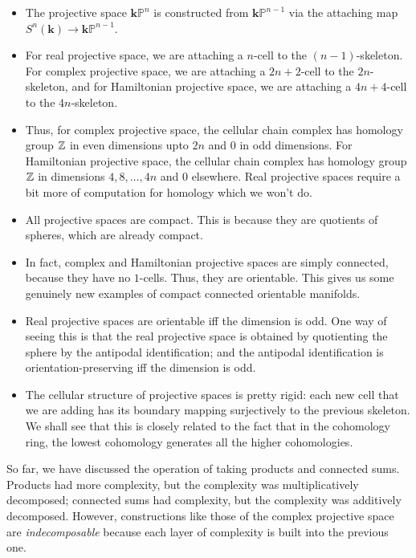 \documentclass[a4paper]{amsart}
\newcommand{\field}{\mathbf{k}}
\begin{document}
\begin{itemize}

\item The projective space $\field \mathbb{P}^n$ is constructed from
  $\field \mathbb{P}^{n-1}$ via the attaching map $S^n(\field) \to
  \field\mathbb{P}^{n-1}$.

\item For real projective space, we are attaching a $n$-cell to the
  $(n-1)$-skeleton. For complex projective space, we are attaching a
  $2n+2$-cell to the $2n$-skeleton, and for Hamiltonian projective
  space, we are attaching a $4n + 4$-cell to the $4n$-skeleton.

\item Thus, for complex projective space, the cellular chain complex
  has homology group $\mathbb{Z}$ in even dimensions upto $2n$ and $0$ in odd
  dimensions. For Hamiltonian projective space, the cellular chain
  complex has homology group $\mathbb{Z}$ in dimensions $4,8,\ldots,4n$ and
  $0$ elsewhere. Real projective spaces require a bit more of
  computation for homology which we won't do.

\item All projective spaces are compact. This is because they are
  quotients of spheres, which are already compact.

\item In fact, complex and Hamiltonian projective spaces are simply
  connected, because they have no $1$-cells. Thus, they are
  orientable. This gives us some genuinely new examples of compact
  connected orientable manifolds.

\item Real projective spaces are orientable iff the dimension is odd.
  One way of seeing this is that the real projective space is obtained
  by quotienting the sphere by the antipodal identification; and the
  antipodal identification is orientation-preserving iff the dimension
  is odd.

\item The cellular structure of projective spaces is pretty
  rigid: each new cell that we are adding has its boundary mapping
  surjectively to the previous skeleton. We shall see that this is
  closely related to the fact that in the cohomology ring, the lowest
  cohomology generates all the higher cohomologies.

\end{itemize}

So far, we have discussed the operation of taking products and
connected sums. Products had more complexity, but the complexity was
multiplicatively decomposed; connected sums had complexity, but the
complexity was additively decomposed. However, constructions like
those of the complex projective space are {\em indecomposable} because
each layer of complexity is built into the previous one.
\end{document}
